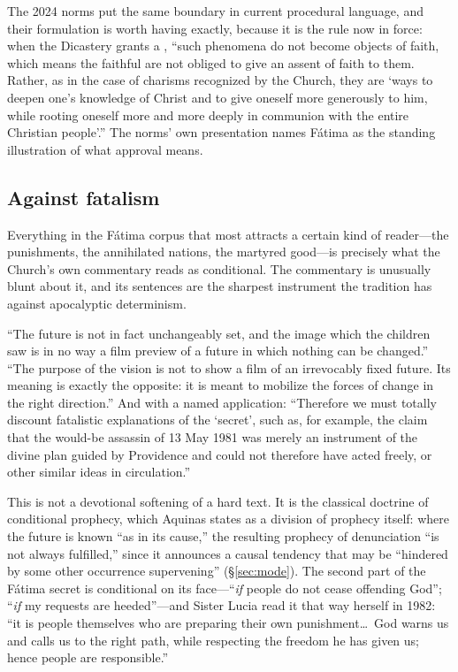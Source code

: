 The 2024 norms put the same boundary in current procedural language,
and their formulation is worth having exactly, because it is the rule
now in force: when the Dicastery grants a ,
``such phenomena do not become objects of faith, which means the
faithful are not obliged to give an assent of faith to them.
Rather, as in the case of charisms recognized by the Church, they are
`ways to deepen one's knowledge of Christ and to give oneself more
generously to him, while rooting oneself more and more deeply in
communion with the entire Christian people'.'' The norms' own
presentation names F\'atima as the standing illustration of what
approval means.

\subsection{Against fatalism}

Everything in the F\'atima corpus that most attracts a certain kind
of reader---the punishments, the annihilated nations, the martyred
good---is precisely what the Church's own commentary reads as
conditional. The commentary is unusually blunt about it, and its
sentences are the sharpest instrument the tradition has against
apocalyptic determinism.

``The future is not in fact unchangeably set, and the image which the
children saw is in no way a film preview of a future in which nothing
can be changed.'' ``The purpose of the vision is not to show a film
of an irrevocably fixed future. Its meaning is exactly the opposite:
it is meant to mobilize the forces of change in the right
direction.'' And with a named application: ``Therefore we must
totally discount fatalistic explanations of the `secret', such as,
for example, the claim that the would-be assassin of 13 May 1981 was
merely an instrument of the divine plan guided by Providence and
could not therefore have acted freely, or other similar ideas in
circulation.''

This is not a devotional softening of a hard text. It is the
classical doctrine of conditional prophecy, which Aquinas states as a
division of prophecy itself: where the future is known ``as in its
cause,'' the resulting prophecy of denunciation ``is not always
fulfilled,'' since it announces a causal tendency that may be
``hindered by some other occurrence supervening''
(\S\ref{sec:mode}). The second part of the F\'atima secret is
conditional on its face---``\emph{if} people do not cease offending
God''; ``\emph{if} my requests are heeded''---and Sister Lucia read
it that way herself in 1982: ``it is people themselves who are
preparing their own punishment\ldots\ God warns us and calls us to
the right path, while respecting the freedom he has given us; hence
people are responsible.''

